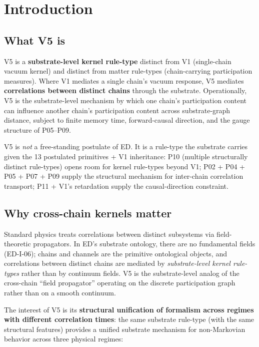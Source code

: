 \documentclass[11pt,a4paper]{article}
\begin{document}
\section{Introduction}

\subsection{What V5 is}

V5 is a \textbf{substrate-level kernel rule-type} distinct from V1 (single-chain vacuum kernel) and distinct from matter rule-types (chain-carrying participation measures). Where V1 mediates a single chain's vacuum response, V5 mediates \textbf{correlations between distinct chains} through the substrate. Operationally, V5 is the substrate-level mechanism by which one chain's participation content can influence another chain's participation content across substrate-graph distance, subject to finite memory time, forward-causal direction, and the gauge structure of P05--P09.

V5 is \emph{not} a free-standing postulate of ED. It is a rule-type the substrate carries given the 13 postulated primitives + V1 inheritance: P10 (multiple structurally distinct rule-types) opens room for kernel rule-types beyond V1; P02 + P04 + P05 + P07 + P09 supply the structural mechanism for inter-chain correlation transport; P11 + V1's retardation supply the causal-direction constraint.

\subsection{Why cross-chain kernels matter}

Standard physics treats correlations between distinct subsystems via field-theoretic propagators. In ED's substrate ontology, there are no fundamental fields (ED-I-06); chains and channels are the primitive ontological objects, and correlations between distinct chains are mediated by \emph{substrate-level kernel rule-types} rather than by continuum fields. V5 is the substrate-level analog of the cross-chain ``field propagator'' operating on the discrete participation graph rather than on a smooth continuum.

The interest of V5 is its \textbf{structural unification of formalism across regimes with different correlation times}: the same substrate rule-type (with the same structural features) provides a unified substrate mechanism for non-Markovian behavior across three physical regimes:
\end{document}
